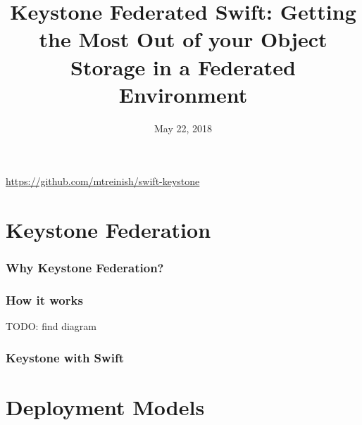 \documentclass[aspectratio=169,11pt,hyperref={colorlinks=true}]{beamer}
\author[Matthew Treinish & Matthew Oliver]{%
    \texorpdfstring{%
        \begin{columns}
            \column{.45\linewidth}
            \centering
            Matthew Treinish\\
            Developer Advocate - IBM\\
            \href{mailto:mtreinish@kortar.org}{mtreinish@kortar.org}\\
        \texttt{mtreinish on Freenode}
        \column{.45\linewidth}
            \centering
            Matthew Oliver\\
            Senior Software Engineer - SUSE\\
            \href{mailto:matt@oliver.net.au}{matt@oliver.net.au}\\
            \texttt{mattoliverau on Freenode}
        \end{columns}
        }
    {Matthew Treinish & Matthew Oliver}
}
\date{May 22, 2018}
\title[Keystone Federated Swift: Getting the Most Out of your Object Storage in a Federated Environment
\hspace{2em}\insertframenumber/\inserttotalframenumber]{Keystone Federated Swift: Getting the Most Out of your Object Storage in a Federated Environment}
\begin{document}
{%
\begin{frame}[noframenumbering]
    \hypersetup{colorlinks,urlcolor=white}
    \titlepage{}
    \centering
    \href{https://github.com/mtreinish/swift-keystone}{https://github.com/mtreinish/swift-keystone}
\end{frame}
}

\section{Keystone Federation}
\begin{frame}
    \frametitle{Why Keystone Federation?}
    \begin{itemize}

    \end{itemize}
\end{frame}

\begin{frame}
    \frametitle{How it works}
    TODO: find diagram
\end{frame}

\begin{frame}
    \frametitle{Keystone with Swift}
\end{frame}

\section{Deployment Models}
\end{document}
